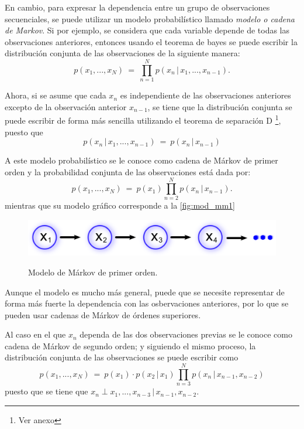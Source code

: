 En cambio, para expresar la dependencia entre un grupo de observaciones secuenciales, se puede utilizar un modelo probabilístico llamado \textit{modelo o cadena de Markov}. Si por ejemplo, se considera que cada variable depende de todas las observaciones anteriores, entonces usando el teorema de bayes
se puede escribir la distribución conjunta de las observaciones de la siguiente manera:
\begin{equation}
\label{eqn:2-2}
p(x_1, ..., x_N) ~=~ \prod_{n=1}^N p(x_n \,|\, x_1, ..., x_{n-1}).
\end{equation}

Ahora, si se asume que cada $x_n$ es independiente de las observaciones anteriores excepto de la observación anterior $x_{n-1}$, se tiene que la distribución conjunta se puede escribir de forma más sencilla utilizando el teorema de separación D \footnote{Ver anexo}, puesto que 
\begin{equation}
\label{eqn:2-3}
p(x_n \,|\, x_1, ..., x_{n-1}) ~=~ p(x_n \,|\, x_{n-1})
\end{equation}

A este modelo probabilístico se le conoce como cadena de Márkov de primer orden y la probabilidad conjunta de las observaciones está dada por:
\begin{equation}
\label{eqn:2-4}
p(x_1, ..., x_N) ~=~ p(x_1) \prod_{n=2}^N p(x_n \,|\, x_{n-1}).
\end{equation}
mientras que su modelo gráfico corresponde a la \autoref{fig:mod_mm1}
\begin{figure}[bt]
        \myfloatalign
        {\includegraphics[width=0.6\linewidth]{gfx/chap2/mod-mm1}}
        \caption{Modelo de Márkov de primer orden.}
        \label{fig:mod_mm1}
\end{figure}

Aunque el modelo es mucho más general, puede que se necesite representar de forma más fuerte la dependencia con las osbervaciones anteriores, por lo que se pueden usar cadenas de Márkov de órdenes superiores.

Al caso en el que $x_n$ dependa de las dos observaciones previas se le conoce como cadena de Márkov de segundo orden; y siguiendo el mismo proceso, la distribución conjunta de las observaciones se puede escribir como 
\begin{equation}
\label{eqn:2-5}
p(x_1, ..., x_N) ~=~ p(x_1) \cdot p(x_2 \,|\, x_1) 
        \prod_{n=3}^N p(x_n \,|\, x_{n-1}, x_{n-2})
\end{equation}
puesto que se tiene que $x_n \perp x_1, ..., x_{n-3} \,|\, x_{n-1}, x_{n-2}$.

